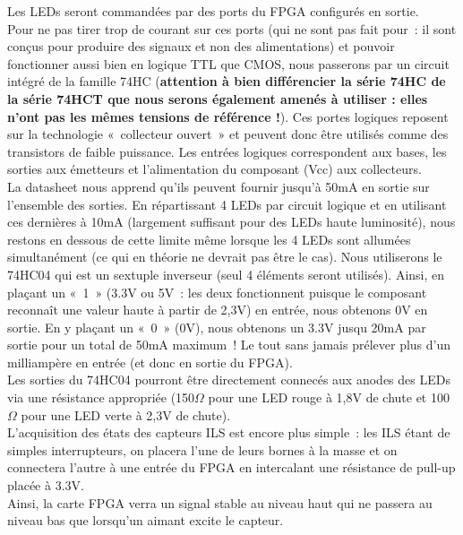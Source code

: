 			Les LEDs seront commandées par des ports du FPGA configurés en sortie.\\
			Pour ne pas tirer trop de courant sur ces ports (qui ne sont pas fait pour : il sont conçus pour produire des signaux et non des alimentations) et pouvoir fonctionner aussi bien en logique TTL que CMOS, nous passerons par un circuit intégré de la famille 74HC (\textbf{attention à bien différencier la série 74HC de la série 74HCT que nous serons également amenés à utiliser : elles n'ont pas les mêmes tensions de référence !}). 
			Ces portes logiques reposent sur la technologie « collecteur ouvert » et peuvent donc être utilisés comme des transistors de faible puissance. Les entrées logiques correspondent aux bases, les sorties aux émetteurs et l’alimentation du composant (Vcc) aux collecteurs.\\

			La datasheet \cite{bib24} nous apprend qu’ils peuvent fournir jusqu’à 50mA en sortie sur l’ensemble des sorties. En répartissant 4 LEDs par circuit logique et en utilisant ces dernières à 10mA (largement suffisant pour des LEDs  haute luminosité), nous restons en dessous de cette limite même lorsque les 4 LEDs sont allumées simultanément (ce qui en théorie ne devrait pas être le cas).
			Nous utiliserons le 74HC04 qui est un sextuple inverseur (seul 4 éléments seront utilisés). Ainsi, en plaçant un « 1 » (3.3V ou 5V : les deux fonctionnent puisque le composant reconnaît une valeur haute à partir de 2,3V) en entrée, nous obtenons 0V en sortie. En y plaçant un « 0 » (0V), nous obtenons un 3.3V jusqu 20mA par sortie pour un total de 50mA maximum ! Le tout sans jamais prélever plus d’un milliampère en entrée (et donc en sortie du FPGA).\\

			Les sorties du 74HC04 pourront être directement connecés aux anodes des LEDs via une résistance appropriée (150$\Omega$ pour une LED rouge à 1,8V de chute et 100$\Omega$ pour une LED verte à 2,3V de chute).\\


			L’acquisition des états des capteurs ILS est encore plus simple : les ILS étant de simples interrupteurs, on placera l’une de leurs bornes à la masse et on connectera l’autre à une entrée du FPGA en intercalant une résistance de pull-up placée à 3.3V.\\
			Ainsi, la carte FPGA verra un signal stable au niveau haut qui ne passera au niveau bas que lorsqu’un aimant excite le capteur.\\

